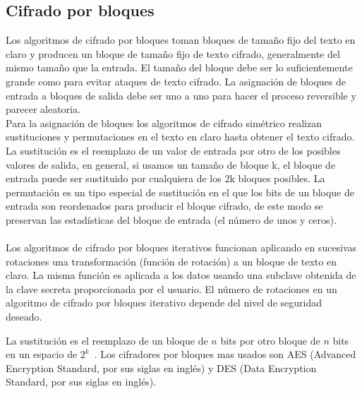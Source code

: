 \subsection{Cifrado por bloques}
Los algoritmos de cifrado por bloques toman bloques de tamaño fijo del texto en claro y producen un bloque de tamaño fijo de texto cifrado, generalmente del mismo tamaño que la entrada. El tamaño del bloque debe ser lo suficientemente grande como para evitar ataques de texto cifrado. La asignación de bloques de entrada a bloques de salida debe ser uno a uno para hacer el proceso reversible y parecer aleatoria.\\ 
Para la asignación de bloques los algoritmos de cifrado simétrico realizan sustituciones y permutaciones en el texto en claro hasta obtener el texto cifrado.\\ 
La sustitución es el reemplazo de un valor de entrada por otro de los posibles valores de salida, en general, si usamos un tamaño de bloque k, el bloque de entrada puede ser sustituido por cualquiera de los 2k bloques posibles.
La permutación es un tipo especial de sustitución en el que los bits de un bloque de entrada son reordenados para producir el bloque cifrado, de este modo se preservan las estadísticas del bloque de entrada (el número de unos y ceros). \\ \\  Los algoritmos de cifrado por bloques iterativos funcionan aplicando en sucesivas rotaciones una transformación
(función de rotación) a un bloque de texto en claro. La misma función es aplicada a los datos usando una subclave
obtenida de la clave secreta proporcionada por el usuario. El número de rotaciones en un algoritmo de cifrado por
bloques iterativo depende del nivel de seguridad deseado.


La sustitución es el reemplazo de un bloque de $n$ bits por otro bloque de $n$ bits en un espacio de 
$2^{k}$~\cite{bloc}. Los cifradores por bloques mas usados son AES (Advanced Encryption Standard, por sus 
siglas en ingl\'es) y DES (Data Encryption Standard, por sus siglas en ingl\'es).



